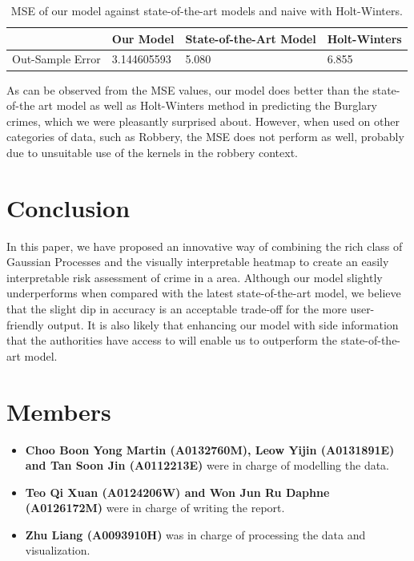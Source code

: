 \documentclass[letterpaper]{article}
\begin{document}
	\begin{table}[!ht]
		\begin{tabular}{| p{1cm} | l | p{2cm} | p{1.5cm} | }
		\hline
		& Our Model & State-of-the-Art Model & Holt-Winters \\ \hline
		Out-Sample Error & 3.144605593 & 5.080 & 6.855\\
		\hline
		\end{tabular}
		\caption{MSE of our model against state-of-the-art models and naive with Holt-Winters.}
		\label{t2}
	\end{table}

	As can be observed from the MSE values, our model does better than the state-of-the art model as well as Holt-Winters method in predicting the Burglary crimes, which we were pleasantly surprised about. However, when used on other categories of data, such as Robbery, the MSE does not perform as well, probably due to unsuitable use of the kernels in the robbery context.	
	\section{Conclusion}
	In this paper, we have proposed an innovative way of combining the rich class of Gaussian Processes and the visually interpretable heatmap to create an easily interpretable risk assessment of crime in a area.
	Although our model slightly underperforms when compared with the latest state-of-the-art model, we believe that the slight dip in accuracy is an acceptable trade-off for the more user-friendly output.
	It is also likely that enhancing our model with side information that the authorities have access to will enable us to outperform the state-of-the-art model.
	
	\section{Members}
	\begin{itemize}
		\item {\bf Choo Boon Yong Martin (A0132760M), Leow Yijin (A0131891E) and Tan Soon Jin (A0112213E)} were in charge of modelling the data.
		\item {\bf Teo Qi Xuan (A0124206W) and Won Jun Ru Daphne (A0126172M)} were in charge of writing the report.
		\item {\bf Zhu Liang (A0093910H)} was in charge of processing the data and visualization.
	\end{itemize}
\end{document}
